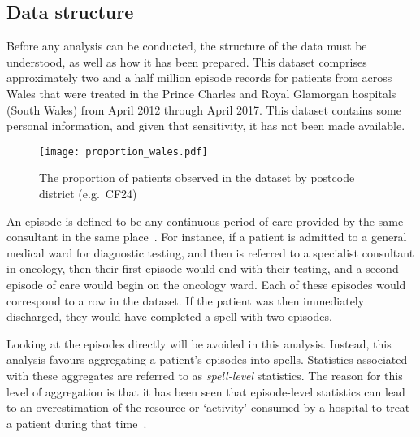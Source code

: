 \subsection{Data structure}\label{subsec:structure}

Before any analysis can be conducted, the structure of the data must be
understood, as well as how it has been prepared. This dataset comprises
approximately two and a half million episode records for patients from across
Wales that were treated in the Prince Charles and Royal Glamorgan hospitals
(South Wales) from April 2012 through April 2017. This dataset contains some
personal information, and given that sensitivity, it has not been made
available.

\begin{figure}
    \centering
    \texttt{[image: proportion\_wales.pdf]}
    \caption{%
        The proportion of patients observed in the dataset by postcode district
        (e.g.\ CF24)%
    }\label{fig:proportion_wales}
\end{figure}

An episode is defined to be any continuous period of care provided by the same
consultant in the same place~\cite{NHS:episode}. For instance, if a patient is
admitted to a general medical ward for diagnostic testing, and then is referred
to a specialist consultant in oncology, then their first episode would end with
their testing, and a second episode of care would begin on the oncology ward.
Each of these episodes would correspond to a row in the dataset. If the patient
was then immediately discharged, they would have completed a spell with two
episodes.

Looking at the episodes directly will be avoided in this analysis. Instead, this
analysis favours aggregating a patient's episodes into spells. Statistics
associated with these aggregates are referred to as \emph{spell-level}
statistics. The reason for this level of aggregation is that it has been seen
that episode-level statistics can lead to an overestimation of the resource or
`activity' consumed by a hospital to treat a patient during that
time~\cite{Aylin2004}.

